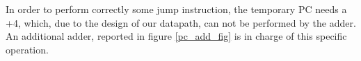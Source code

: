 In order to perform correctly some jump instruction, the temporary PC needs a +4, which, due to the design of our datapath, can not be performed by the adder. An additional adder, reported in figure \ref{pc_add_fig} is in charge of this specific operation.






